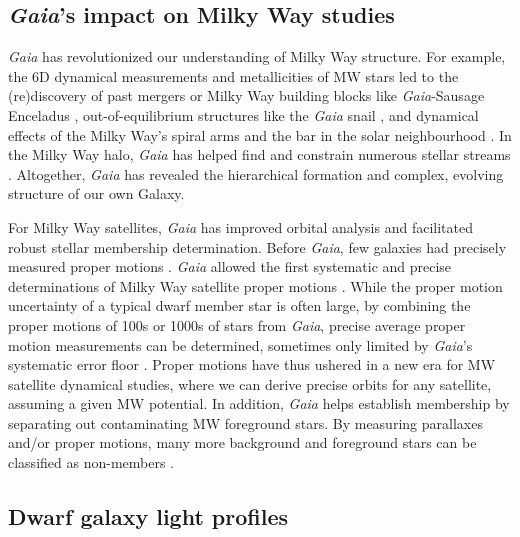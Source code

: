 \subsection{\texorpdfstring{\emph{Gaia}'s impact on Milky Way
studies}{Gaia's impact on Milky Way studies}}\label{gaias-impact-on-milky-way-studies}

\emph{Gaia} has revolutionized our understanding of Milky Way structure.
For example, the 6D dynamical measurements and metallicities of MW stars
led to the (re)discovery of past mergers or Milky Way building blocks
like \emph{Gaia}-Sausage Enceladus
\citetext{\citealp[e.g.,][]{helmi+2018}; \citealp{belokurov+2018}; \citealp[but
see also][]{meza+2005}}, out-of-equilibrium structures like the
\emph{Gaia} snail \citep[e.g.,][]{antoja+2018}, and dynamical effects of
the Milky Way's spiral arms and the bar in the solar neighbourhood
\citep[ and references therein]{hunt+vasiliev2025}. In the Milky Way
halo, \emph{Gaia} has helped find and constrain numerous stellar streams
\citep{ibata+malhan+martin2019, bonaca+price-whelan2025}. Altogether,
\emph{Gaia} has revealed the hierarchical formation and complex,
evolving structure of our own Galaxy.

For Milky Way satellites, \emph{Gaia} has improved orbital analysis and
facilitated robust stellar membership determination. Before \emph{Gaia},
few galaxies had precisely measured proper motions \citep[e.g.~using
Hubble Space Telescope,][]{sohn+2017}. \emph{Gaia} allowed the first
systematic and precise determinations of Milky Way satellite proper
motions \citep{pace+li2019, MV2020a}. While the proper motion
uncertainty of a typical dwarf member star is often large, by combining
the proper motions of 100s or 1000s of stars from \emph{Gaia}, precise
average proper motion measurements can be determined, sometimes only
limited by \emph{Gaia}'s systematic error floor
\citep[e.g.,][]{MV2020a}. Proper motions have thus ushered in a new era
for MW satellite dynamical studies, where we can derive precise orbits
for any satellite, assuming a given MW potential. In addition,
\emph{Gaia} helps establish membership by separating out contaminating
MW foreground stars. By measuring parallaxes and/or proper motions, many
more background and foreground stars can be classified as non-members
\citep[e.g.,][]{battaglia+2022, jensen+2024}.

\subsection{Dwarf galaxy light profiles}\label{sec:exponential_profiles}


